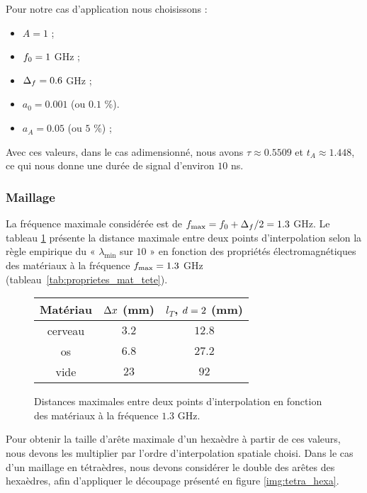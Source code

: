 Pour notre cas d'application nous choisissons :
\begin{itemize}
	\item $A = 1$ ;
	\item $f_0 = 1$ GHz ;
	\item $\Delta_f = 0.6$ GHz ;
	\item $a_0 = 0.001$ (ou $0.1$ \%).
	\item $a_A = 0.05$ (ou $5$ \%) ;
\end{itemize}
Avec ces valeurs, dans le cas adimensionné,
nous avons $\tau \approx 0.5509$ et $t_A \approx 1.448$,
ce qui nous donne une durée de signal d'environ $10$ ns.


\subsubsection{Maillage}


La fréquence maximale considérée est de $f_{\max} =
f_0 + \Delta_f / 2 = 1.3$ GHz.
Le tableau \ref{tab:dx_mat_tete} présente la distance maximale
entre deux points d'interpolation 
selon la règle empirique du « $\lambda_{\min}$ sur $10$ »
en fonction des propriétés électromagnétiques des matériaux
à la fréquence $f_{\max} = 1.3$ GHz
(tableau~\ref{tab:proprietes_mat_tete}).


\begin{figure}[!h]
	\begin{center}
		\caption{
			\label{tab:dx_mat_tete}
			Distances maximales
			entre deux points d'interpolation
			en fonction des matériaux
			à la fréquence $1.3$ GHz.
		}
		
		\begin{tabular}{|c|c|c|}
			\hline
			Matériau & $\Delta x$ (mm) & $l_T$, $d = 2$ (mm) \\ \hline\hline
			cerveau & $3.2$ & $12.8$ \\	\hline
			os & $6.8$ & $27.2$ \\	\hline
			vide & $23$ & $92$ \\	\hline
		\end{tabular}
	\end{center}
\end{figure}


Pour obtenir la taille d'arête maximale d'un hexaèdre à partir
de ces valeurs,
nous devons les multiplier par l'ordre d'interpolation spatiale choisi.
Dans le cas d'un maillage en tétraèdres, nous devons considérer
le double des arêtes des hexaèdres, afin d'appliquer le découpage
présenté en figure \ref{img:tetra_hexa}.

